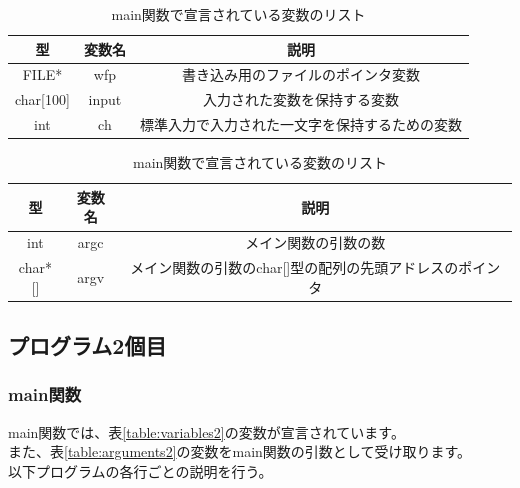 \documentclass[dvipdfmx]{jsarticle}
\begin{document}
\begin{table}[ht]
  \centering
  \begin{tabular}{|c|c|c|}
    \hline
    型     & 変数名 & 説明                         \\
    \hline
    FILE* & wfp & 書き込み用のファイルのポインタ変数          \\
    char[100] & input & 入力された変数を保持する変数             \\
    int   & ch  & 標準入力で入力された一文字を保持するための変数 \\
    \hline
  \end{tabular}
  \caption{main関数で宣言されている変数のリスト}
  \label{table:variables}
\end{table}

\begin{table}[ht]
  \centering
  \begin{tabular}{|c|c|c|}
    \hline
    型       & 変数名  & 説明                              \\
    \hline
    int     & argc & メイン関数の引数の数                      \\
    char*[] & argv & メイン関数の引数のchar[]型の配列の先頭アドレスのポインタ \\
    \hline
  \end{tabular}
  \caption{main関数で宣言されている変数のリスト}
  \label{table:arguments}
\end{table}

\subsection{プログラム2個目}
\subsubsection{main関数}
main関数では、表\ref{table:variables2}の変数が宣言されています。\\
また、表\ref{table:arguments2}の変数をmain関数の引数として受け取ります。\\
以下プログラムの各行ごとの説明を行う。
\end{document}
